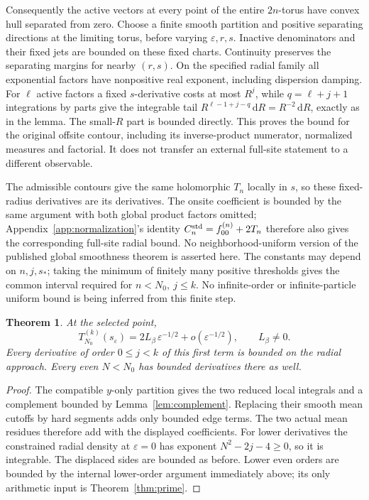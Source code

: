\documentclass[11pt]{article}
\numberwithin{equation}{section}
\newtheorem{theorem}{Theorem}[section]
\theoremstyle{definition}
\newcommand{\dd}{\,\mathrm d}
\newcommand{\eps}{\varepsilon}
\newcommand{\se}{s_\varepsilon}
\begin{document}
Consequently the active vectors at every point of the entire
\(2n\)-torus have convex hull separated from zero. Choose a finite
smooth partition and positive separating directions at the limiting
torus, before varying \(\eps,r,s\). Inactive denominators and their
fixed jets are bounded on these fixed charts. Continuity preserves
the separating margins for nearby \((r,s)\). On the specified radial
family all exponential factors have nonpositive real exponent,
including dispersion damping. For \(\ell\) active factors a fixed
\(s\)-derivative costs at most \(R^j\), while
\(q=\ell+j+1\) integrations by parts give the integrable tail
\(R^{\ell-1+j-q}\dd R=R^{-2}\dd R\), exactly as in the lemma.
The small-\(R\) part is bounded directly. This proves the bound for
the original offsite contour, including its inverse-product numerator,
normalized measures and factorial. It does not transfer an external
full-site statement to a different observable.

The admissible contours give the same holomorphic \(T_n\) locally
in \(s\), so these fixed-radius derivatives are its derivatives.
The onsite coefficient is bounded by the same argument with both
global product factors omitted; Appendix~\ref{app:normalization}'s
identity \(C_n^{\rm std}=f_{00}^{(n)}+2T_n\) therefore also gives the
corresponding full-site radial bound. No neighborhood-uniform version
of the published global smoothness theorem is asserted here. The
constants may depend on \(n,j,s_*\); taking the minimum of finitely
many positive thresholds gives the common interval required for
\(n<N_0,\ j\le k\). No infinite-order or infinite-particle uniform
bound is being inferred from this finite step.

\begin{theorem}\label{thm:first}
At the selected point,
\[
 T_{N_0}^{(k)}(\se)=2L_\beta\,\eps^{-1/2}+o(\eps^{-1/2}),
 \qquad L_\beta\ne0.
\]
Every derivative of order \(0\le j<k\) of this first term is bounded
on the radial approach. Every even \(N<N_0\) has bounded derivatives
there as well.
\end{theorem}
\begin{proof}
The compatible \(y\)-only partition gives the two reduced local
integrals and a complement bounded by Lemma~\ref{lem:complement}.
Replacing their smooth mean cutoffs by hard segments adds only bounded
edge terms. The two actual mean residues therefore add with the
displayed coefficients. For lower derivatives the constrained radial
density at \(\eps=0\)
has exponent \(N^2-2j-4\ge0\), so it is integrable.
The displaced sides are bounded as before. Lower even orders are
bounded by the internal lower-order argument immediately above; its
only arithmetic input is Theorem~\ref{thm:prime}.
\end{proof}
\end{document}
